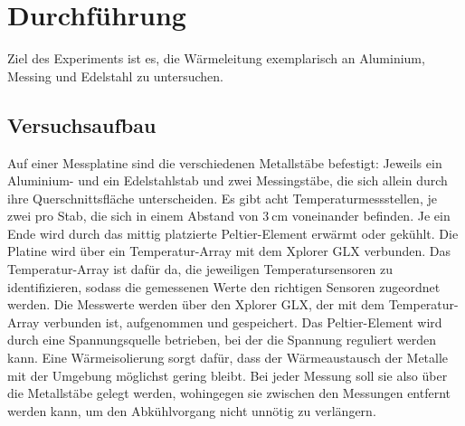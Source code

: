 \section{Durchführung}
\label{sec:Durchführung}
Ziel des Experiments ist es, die Wärmeleitung exemplarisch an Aluminium, Messing und Edelstahl zu untersuchen. 
\subsection{Versuchsaufbau}
Auf einer Messplatine sind die verschiedenen Metallstäbe befestigt: 
Jeweils ein Aluminium- und ein Edelstahlstab und zwei Messingstäbe, die sich allein durch ihre Querschnittsfläche unterscheiden.
Es gibt acht Temperaturmessstellen, je zwei pro Stab, die sich in einem Abstand von $\SI{3}{\centi\meter}$ voneinander befinden. 
Je ein Ende wird durch das mittig platzierte Peltier-Element erwärmt oder gekühlt. 
Die Platine wird über ein Temperatur-Array mit dem Xplorer GLX verbunden. 
Das Temperatur-Array ist dafür da, die jeweiligen Temperatursensoren zu identifizieren, sodass die gemessenen Werte den richtigen Sensoren zugeordnet werden.
Die Messwerte werden über den Xplorer GLX, der mit dem Temperatur-Array verbunden ist, aufgenommen und gespeichert. 
Das Peltier-Element wird durch eine Spannungsquelle betrieben, bei der die Spannung reguliert werden kann. 
Eine Wärmeisolierung sorgt dafür, dass der Wärmeaustausch der Metalle mit der Umgebung möglichst gering bleibt.
Bei jeder Messung soll sie also über die Metallstäbe gelegt werden, wohingegen sie zwischen den Messungen entfernt 
werden kann, um den Abkühlvorgang nicht unnötig zu verlängern. 

